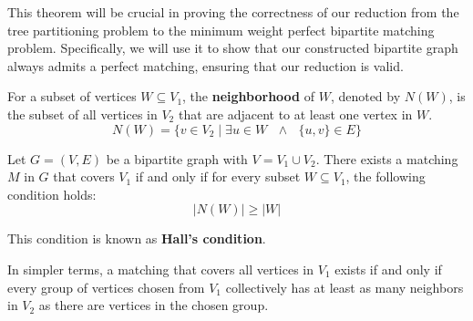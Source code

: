 This theorem will be crucial in proving the correctness of our reduction from the tree partitioning problem to the minimum weight perfect bipartite matching problem. Specifically, we will use it to show that our constructed bipartite graph always admits a perfect matching, ensuring that our reduction is valid.
    
\begin{definition}[Neighborhood] \label{def:neighborhood}
For a subset of vertices $W \subseteq V_1$, the \textbf{neighborhood} of $W$, denoted by $N(W)$, is the subset of all vertices in $V_2$ that are adjacent to at least one vertex in $W$.
\[ N(W) = \{ v \in V_2 \mid \exists u \in W \text{ $\land$ } \{u, v\} \in E \} \]
\end{definition}

\begin{theorem} \label{thm:halls_marriage_theorem}
    Let $G = (V, E)$ be a bipartite graph with $V = V_1 \cup V_2$. There exists a matching $M$ in $G$ that covers $V_1$ if and only if for every subset $W \subseteq V_1$, the following condition holds:
    $$|N(W)| \geq |W|$$
\end{theorem}

This condition is known as \textbf{Hall's condition}.

In simpler terms, a matching that covers all vertices in $V_1$ exists if and only if every group of vertices chosen from $V_1$ collectively has at least as many neighbors in $V_2$ as there are vertices in the chosen group.

